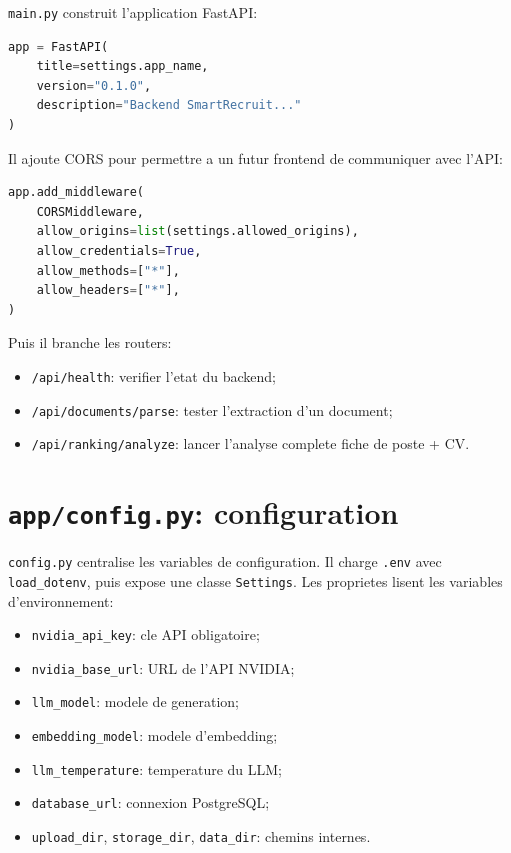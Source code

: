 \documentclass[12pt,a4paper]{article}
\begin{document}
\texttt{main.py} construit l'application FastAPI:

\begin{lstlisting}[style=smartcode,language=Python]
app = FastAPI(
    title=settings.app_name,
    version="0.1.0",
    description="Backend SmartRecruit..."
)
\end{lstlisting}

Il ajoute CORS pour permettre a un futur frontend de communiquer avec l'API:

\begin{lstlisting}[style=smartcode,language=Python]
app.add_middleware(
    CORSMiddleware,
    allow_origins=list(settings.allowed_origins),
    allow_credentials=True,
    allow_methods=["*"],
    allow_headers=["*"],
)
\end{lstlisting}

Puis il branche les routers:

\begin{itemize}
  \item \texttt{/api/health}: verifier l'etat du backend;
  \item \texttt{/api/documents/parse}: tester l'extraction d'un document;
  \item \texttt{/api/ranking/analyze}: lancer l'analyse complete fiche de poste + CV.
\end{itemize}

\section{\texttt{app/config.py}: configuration}

\texttt{config.py} centralise les variables de configuration. Il charge \texttt{.env} avec \texttt{load\_dotenv}, puis expose une classe \texttt{Settings}. Les proprietes lisent les variables d'environnement:

\begin{itemize}
  \item \texttt{nvidia\_api\_key}: cle API obligatoire;
  \item \texttt{nvidia\_base\_url}: URL de l'API NVIDIA;
  \item \texttt{llm\_model}: modele de generation;
  \item \texttt{embedding\_model}: modele d'embedding;
  \item \texttt{llm\_temperature}: temperature du LLM;
  \item \texttt{database\_url}: connexion PostgreSQL;
  \item \texttt{upload\_dir}, \texttt{storage\_dir}, \texttt{data\_dir}: chemins internes.
\end{itemize}
\end{document}
